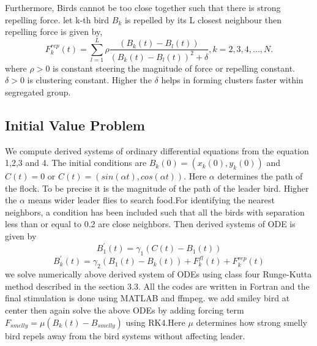 \documentclass{article}
\begin{document}
Furthermore, Birds cannot be too close together such that there is strong repelling force. let k-th bird $B_k$ is repelled by its L closest neighbour then repelling force is given by, 
\begin{equation}
    F^{rep}_k(t) = \sum_{l=1}^{L}\rho \frac{(B_k(t)-B_l(t))}{(B_k(t)-B_l(t))^{2}+\delta},   k=2,3,4,...,N.
\end{equation}
where $\rho>0$ is constant steering the magnitude of force or repelling constant. $\delta>0$ is clustering constant. Higher the $\delta$ helps in forming clusters faster within segregated group.

\subsection{Initial Value Problem}
We compute derived systems of ordinary differential equations from the equation 1,2,3 and 4. The initial conditions are $B_k(0)=(x_k(0),y_k(0))$ and $C(t)=0$ or $C(t)=(sin(\alpha t),cos(\alpha t))$. Here $\alpha$ determines the path of the flock. To be precise it is the magnitude of the path of the leader bird. Higher the $\alpha$ means wider leader flies to search food.For identifying the nearest neighbors, a condition has been included such that all the birds with separation less than or equal to 0.2 are close neighbors. Then derived systems of ODE is given by
\begin{equation*}
    B^{'}_1(t) = \gamma_1 (C(t)-B_1(t)) 
\end{equation*}
\begin{equation*}
     B^{'}_k(t) = \gamma_2 (B_1(t)-B_k(t))+F^{fl}_k(t)+F^{rep}_k(t)
\end{equation*}
we solve numerically above derived system of ODEs using class four Runge-Kutta method described in the section 3.3. All the codes are written in Fortran and the final stimulation is done using MATLAB and ffmpeg. we add smiley bird at center then again solve the above ODEs by adding forcing term $F_{smelly}=\mu(B_k(t)-B_{smelly})$ using RK4.Here $\mu$ determines how strong smelly bird repels away from the bird systems without affecting leader.
\end{document}
